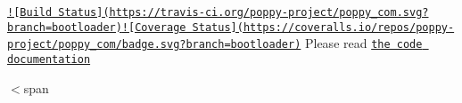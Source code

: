 \href{https://travis-ci.org/poppy-project/poppy_com}{\tt !\mbox{[}Build Status\mbox{]}(https\-://travis-\/ci.\-org/poppy-\/project/poppy\-\_\-com.\-svg?branch=bootloader)}\href{https://coveralls.io/github/poppy-project/poppy_com?branch=bootloader}{\tt !\mbox{[}Coverage Status\mbox{]}(https\-://coveralls.\-io/repos/poppy-\/project/poppy\-\_\-com/badge.\-svg?branch=bootloader)} Please read \href{http://poppy-project.github.io/poppy_com/}{\tt the code documentation}

$<$span 